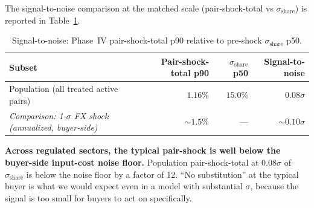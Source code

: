 The signal-to-noise comparison at the matched scale (pair-shock-total vs $\sigma_{\text{share}}$) is reported in Table~\ref{tab:signal_to_noise}.

\begin{table}[H]
    \centering
    \caption{Signal-to-noise: Phase~IV pair-shock-total p90 relative to pre-shock $\sigma_{\text{share}}$ p50.}
    \label{tab:signal_to_noise}
    \footnotesize
    \begin{tabular}{lrrr}
        \toprule
        Subset & Pair-shock-total p90 & $\sigma_{\text{share}}$ p50 & Signal-to-noise \\
        \midrule
        Population (all treated active pairs) & $1.16\%$ & $15.0\%$ & $0.08\sigma$ \\
        \midrule
        \emph{Comparison: \citet{heise2024} 1-$\sigma$ FX shock (annualized, buyer-side)} & $\sim 1.5\%$ & --- & $\sim 0.10\sigma$ \\
        \bottomrule
    \end{tabular}
\end{table}

\textbf{Across regulated sectors, the typical pair-shock is well below the buyer-side input-cost noise floor.} Population pair-shock-total at $0.08\sigma$ of $\sigma_{\text{share}}$ is below the noise floor by a factor of 12. ``No substitution'' at the typical buyer is what we would expect even in a model with substantial $\sigma$, because the signal is too small for buyers to act on specifically.

